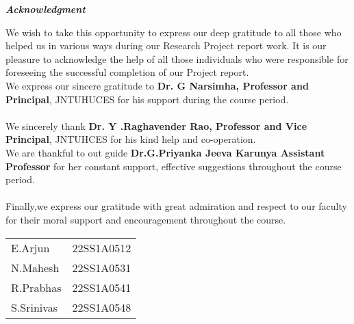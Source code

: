\documentclass[12pt,a4paper]{report}
\begin{document}
\newpage
{} 
\begin{center}
{\LARGE \textbf{\textit{Acknowledgment}}}
\end{center}
\vspace{1cm}
{\large {We wish to take this opportunity to express our deep gratitude to all those who helped us in various ways during our Research Project report work. It is our pleasure to acknowledge the help of all those individuals who were responsible for foreseeing the successful completion of our Project report.\\
\hspace*{35pt}We express our sincere gratitude to \textbf{\large Dr. G Narsimha, Professor and Principal}, JNTUHUCES for his support during the course period.\\ \\
\hspace*{35pt}We sincerely thank \textbf{\large Dr. Y .Raghavender Rao, Professor and Vice Principal}, JNTUHCES for his kind help and co-operation.\\

\hspace*{35pt}We are thankful to out guide \textbf{\large Dr.G.Priyanka Jeeva Karunya  Assistant Professor} for her constant support, effective suggestions throughout the course period.\\\\
\hspace*{35pt}Finally,we express our gratitude with great admiration and respect to our faculty for their moral support and encouragement throughout the course.}}
\vspace{4.0cm}
\begin{table}[ht]
 \begin{flushright}
  \begin{tabular}{l r}
  {\large E.Arjun} & {\large 22SS1A0512}\\
  {\large N.Mahesh} & {\large 22SS1A0531}\\
  {\large R.Prabhas} & {\large 22SS1A0541}\\
  {\large S.Srinivas} & {\large 22SS1A0548}\\
  
 \end{tabular}
 \end{flushright}
\end{table}
\end{document}
